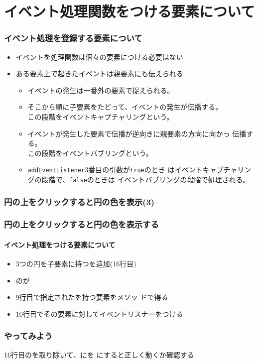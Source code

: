 \section{イベント処理関数をつける要素について}
\begin{frame}[containsverbatim]
 \frametitle{イベント処理を登録する要素について\newline{}}
\begin{itemize}
 \item イベントを処理関数は個々の要素につける必要はない
 \item ある要素上で起きたイベントは親要素にも伝えられる
       \begin{itemize}
        \item イベントの発生は一番外の要素で捉えられる。
        \item そこから順に子要素をたどって、イベントの発生が伝播する。
              \\この段階をイベントキャプチャリングという。
        \item イベントが発生した要素で伝播が逆向きに親要素の方向に向かっ
           伝播する。\\この段階をイベントバブリングという。
        \item \texttt{addEventListener}3番目の引数が\texttt{true}のとき
              はイベントキャプチャリングの段階で、\texttt{false}のときは
              イベントバブリングの段階で処理される。
       \end{itemize}
\end{itemize}
\end{frame}
\begin{frame}[containsverbatim]
 \frametitle{円の上をクリックすると円の色を表示(3)%
 }
\end{frame}
\begin{frame}[containsverbatim]
 \frametitle{円の上をクリックすると円の色を表示する}
 \framesubtitle{イベント処理をつける要素について}
\begin{itemize}
 \item 3つの円を子要素に持つを追加(16行目)
 \item {}のが
 \item 9行目で指定されたを持つ要素をメソッ
       ドで得る
 \item 10行目でその要素に対してイベントリスナーをつける
\end{itemize}
\end{frame}
\begin{frame}[containsverbatim]
 \frametitle{やってみよう}
 16行目のを取り除いて、にを
				にすると正しく動くか確認する
\end{frame}
